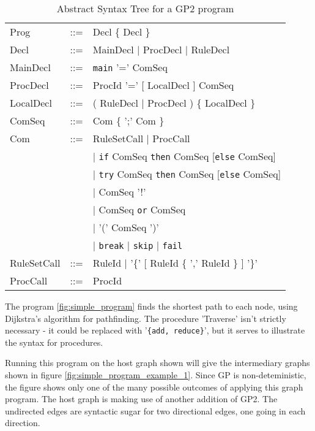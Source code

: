 \documentclass{UoYCSproject}
\begin{document}
\begin{table}
\begin{tabular}{l l l}
Prog        & ::= & Decl \{ Decl \} \\
Decl        & ::= & MainDecl | ProcDecl | RuleDecl \\
MainDecl    & ::= & \texttt{main} '=' ComSeq \\
ProcDecl    & ::= & ProcId '=' [ LocalDecl ] ComSeq \\
LocalDecl   & ::= & ( RuleDecl | ProcDecl ) \{ LocalDecl \} \\
ComSeq      & ::= & Com \{ ';' Com \} \\
Com         & ::= & RuleSetCall | ProcCall \\
            &     & | \texttt{if} ComSeq \texttt{then} ComSeq [\texttt{else} ComSeq] \\
            &     & | \texttt{try} ComSeq \texttt{then} ComSeq [\texttt{else} ComSeq] \\
            &     & | ComSeq '!' \\
            &     & | ComSeq \texttt{or} ComSeq \\
            &     & | '(' ComSeq ')' \\
            &     & | \texttt{break} | \texttt{skip} | \texttt{fail} \\
RuleSetCall & ::= & RuleId | '\{' [ RuleId \{ ',' RuleId \} ] '\}' \\
ProcCall    & ::= & ProcId \\
\end{tabular}
\caption{Abstract Syntax Tree for a GP2 program}
\label{table:gp2_ast}
\end{table}



The program \ref{fig:simple_program} finds the shortest path to each node, using Dijkstra's algorithm for pathfinding. The procedure 'Traverse' isn't strictly necessary - it could be replaced with '\texttt{\{add, reduce\}}', but it serves to illustrate the syntax for procedures. 

Running this program on the host graph shown will give the intermediary graphs shown in figure \ref{fig:simple_program_example_1}. Since GP is non-deteministic, the figure shows only one of the many possible outcomes of applying this graph program. The host graph is making use of another addition of GP2. The undirected edges are syntactic sugar for two directional edges, one going in each direction.


\end{document}
